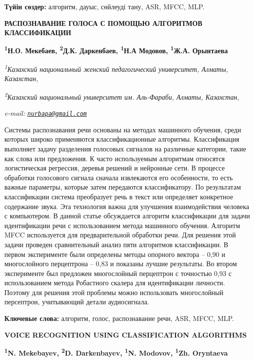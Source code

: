 {\bfseries Түйін сөздер:} алгоритм, дауыс, сөйлеуді тану, ASR, MFCC, MLP.

\begin{articleheader}
{\bfseries РАСПОЗНАВАНИЕ ГОЛОСА С ПОМОЩЬЮ АЛГОРИТМОВ КЛАССИФИКАЦИИ}

{\bfseries
\textsuperscript{1}Н.О. Мекебаев\textsuperscript{\envelope },
\textsuperscript{2}Д.К. Даркенбаев,
\textsuperscript{1}Н.А Модовов,
\textsuperscript{1}Ж.А. Орынтаева}
\end{articleheader}

\begin{affiliation}
{\em \textsuperscript{1}Казахский национальный женский педагогический университет, Алматы, Казахстан,}

{\em \textsuperscript{2}Казахский национальный университет им. Аль-Фараби, Алматы, Казахстан,}

{\em e-mail: \href{mailto:nurbapa@gmail.com}{\nolinkurl{nurbapa@gmail.com}}}
\end{affiliation}

Системы распознавания речи основаны на методах машинного обучения, среди
которых широко применяются классификационные алгоритмы. Классификация
выполняет задачу разделения голосовых сигналов на различные категории,
такие как слова или предложения. К часто используемым алгоритмам
относятся логистическая регрессия, деревья решений и нейронные сети. В
процессе обработки голосового сигнала сначала извлекаются его
особенности, то есть важные параметры, которые затем передаются
классификатору. По результатам классификации система преобразует речь в
текст или определяет конкретное содержание звука. Эта технология важна
для улучшения взаимодействия человека с компьютером. В данной статье
обсуждается алгоритм классификации для задачи идентификации речи с
использованием метода машинного обучения. Алгоритм MFCC используется для
предварительной обработки речи. Для решения этой задачи проведен
сравнительный анализ пяти алгоритмов классификации. В первом
эксперименте были определены методы опорного вектора -- 0,90 и
многослойного перцептрона -- 0,83 и показаны лучшие результаты. Во
втором эксперименте был предложен многослойный перцептрон с точностью
0,93 с использованием метода Робастного скалера для идентификации
личности. Поэтому для решения этой проблемы можно использовать
многослойный персептрон, учитывающий детали аудиосигнала.

{\bfseries Ключевые слова:} алгоритм, голос, распознавание речи, ASR, MFCC,
MLP.

\begin{articleheader}
{\bfseries VOICE RECOGNITION USING CLASSIFICATION ALGORITHMS}

{\bfseries
\textsuperscript{1}N. Mekebayev\textsuperscript{\envelope },
\textsuperscript{2}D. Darkenbayev,
\textsuperscript{1}N. Modovov,
\textsuperscript{1}Zh. Oryntaeva}
\end{articleheader}

